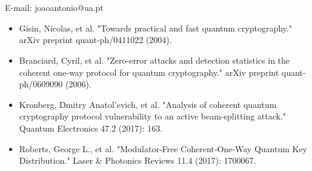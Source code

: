 \documentclass[1000pt]{article}
\newcommand{\mysection}[1]{\section*{\color{black}\sffamily #1}}%
\begin{document}
\mysection{} \sffamily \Large
\vspace{-10mm}
\centerline{E-mail: joaoantonio@ua.pt}
\vspace*{7cm}
\begin{itemize}
	\item Gisin, Nicolas, et al. "Towards practical and fast quantum cryptography." arXiv preprint quant-ph/0411022 (2004).
	\item Branciard, Cyril, et al. "Zero-error attacks and detection statistics in the coherent one-way protocol for quantum cryptography." arXiv preprint quant-ph/0609090 (2006).
	\item Kronberg, Dmitry Anatol'evich, et al. "Analysis of coherent quantum cryptography protocol vulnerability to an active beam-splitting attack." Quantum Electronics 47.2 (2017): 163.
	\item Roberts, George L., et al. "Modulator‐Free Coherent‐One‐Way Quantum Key Distribution." Laser \& Photonics Reviews 11.4 (2017): 1700067.
\end{itemize}
\end{document}
